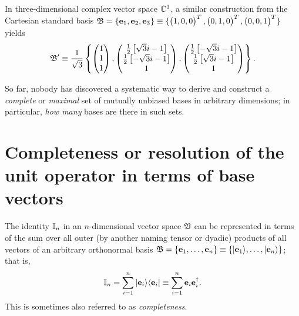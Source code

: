 {In three-dimensional complex vector space ${\Bbb C}^3$, a similar construction
from the Cartesian standard basis
${\frak B}=\{ {\bf e}_1 , {\bf e}_2, {\bf e}_3\} \equiv
\{\begin{pmatrix}1,0,0\end{pmatrix}^T,\begin{pmatrix}0,1,0\end{pmatrix}^T,\begin{pmatrix}0,0,1\end{pmatrix}^T\}$
yields
\begin{equation}
\begin{split}
 {\frak B}' \equiv   \frac{1}{\sqrt{3}}  \left\{
 \begin{pmatrix}1\\1\\1\end{pmatrix},
 \begin{pmatrix}\frac{1}{2} \left[{\sqrt{3}} i-1\right] \\ \frac{1}{2} \left[-{\sqrt{3}} i-1\right] \\
  1\end{pmatrix},
\begin{pmatrix}
 \frac{1}{ 2} \left[-{\sqrt{3}} i-1\right]\\ \frac{1}{ 2} \left[{\sqrt{3}} i-1\right]\\1  \end{pmatrix}
   \right\} .
\end{split}
\end{equation}
\eexample
}

So far, nobody  has discovered a systematic way to derive and construct a {\em complete} or {\em maximal}
set of mutually unbiased bases in arbitrary dimensions; in particular,
{\em how many} bases are there in such sets.


\section{Completeness or resolution of the unit operator in terms of base vectors}

The identity ${\Bbb I}_n$ in an $n$-dimensional vector space ${\frak V}$ can be represented in terms of the sum
over all outer (by another naming tensor or dyadic) products
of all vectors of an arbitrary orthonormal basis
${\frak B} =\{
{\bf e}_1,
\ldots ,
{\bf e}_n
\}
\equiv
\{
\vert {\bf e}_1 \rangle ,
\ldots ,
\vert{\bf e}_n \rangle
\}
$; that is,
\begin{equation}
 {\Bbb I}_n = \sum_{i=1}^n \vert {\bf e}_i \rangle \langle {\bf e}_i \vert
\equiv  \sum_{i=1}^n {\bf e}_i  {\bf e}_i^\dagger  .
\end{equation}
This is sometimes also referred to as {\em completeness}.

